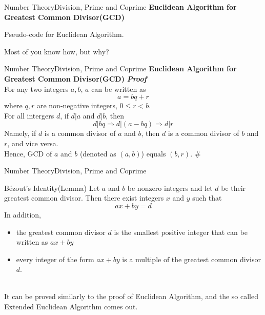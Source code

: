 \documentclass[mathserif,10pt]{beamer}
\begin{document}
\begin{frame}{Number Theory}{Division, Prime and Coprime}
\textbf{\large Euclidean Algorithm for Greatest Common Divisor(GCD)}
\begin{algorithm}[H]
\begin{algorithmic}[1]
	\ELSE
	\ENDIF
\end{algorithmic}
\caption*{Pseudo-code for Euclidean Algorithm.}
\end{algorithm}

\pause
Most of you know how, but why?
\end{frame}

\begin{frame}{Number Theory}{Division, Prime and Coprime}
\textbf{\large Euclidean Algorithm for Greatest Common Divisor(GCD)}
\textbf{\sl Proof}  \\
For any two integers $a, b$, $a$ can be written as $$a = bq + r$$ where $q, r$ are non-negative integers, $0 \leq r < b$. \\ \pause
For all intergers $d$, if $d | a$ and $d | b$, then $$d|bq \Rightarrow d|(a-bq) \Rightarrow d|r$$ \pause
Namely, if $d$ is a common divisor of $a$ and $b$, then $d$ is a common divisor of $b$ and $r$, and vice versa. \\ \pause
Hence, GCD of $a$ and $b$ (denoted as $(a,b)$) equals $(b,r)$. \#
\end{frame}

\begin{frame}{Number Theory}{Division, Prime and Coprime}
\begin{block}{Bézout's Identity(Lemma)}
	Let $a$ and $b$ be nonzero integers and let $d$ be their greatest common divisor. Then there exist integers $x$ and $y$ such that $$ax+by=d$$ 
	In addition, 
	\begin{itemize}
		\item the greatest common divisor $d$ is the smallest positive integer that can be written as $ax + by$
		\item every integer of the form $ax + by$ is a multiple of the greatest common divisor $d$.
	\end{itemize}
\end{block}
~\\
It can be proved similarly to the proof of Euclidean Algorithm, and the so called Extended Euclidean Algorithm comes out.
\end{frame}
\end{document}
